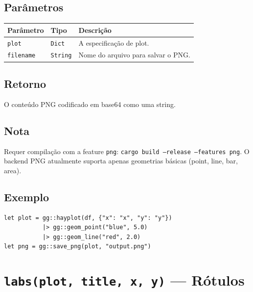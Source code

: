 \documentclass[12pt, a4paper, oneside]{book}
\newcommand{\code}[1]{\texttt{#1}}
\begin{document}
\subsection*{Parâmetros}

\begin{tabularx}{\textwidth}{@{}lL{2.5cm}X@{}}
  \toprule
  \textbf{Parâmetro} & \textbf{Tipo} & \textbf{Descrição} \\
  \midrule
  \code{plot}     & \code{Dict}   & A especificação de plot. \\[4pt]
  \code{filename} & \code{String} & Nome do arquivo para salvar o PNG. \\
  \bottomrule
\end{tabularx}

\subsection*{Retorno}

O conteúdo PNG codificado em base64 como uma string.

\subsection*{Nota}

Requer compilação com a feature \code{png}: \code{cargo build --release --features png}. O backend PNG atualmente suporta apenas geometrias básicas (point, line, bar, area).

\subsection*{Exemplo}

\begin{lstlisting}[caption={Salvamento PNG em um passo}]
let plot = gg::hayplot(df, {"x": "x", "y": "y"})
           |> gg::geom_point("blue", 5.0)
           |> gg::geom_line("red", 2.0)
let png = gg::save_png(plot, "output.png")
\end{lstlisting}


\section{\texttt{labs(plot, title, x, y)} --- Rótulos}
\end{document}
